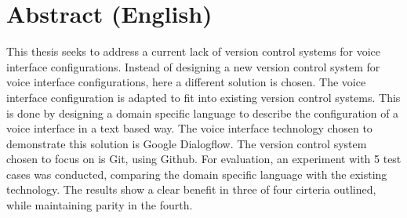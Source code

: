 \chapter*{Abstract (English)}

This thesis seeks to address a current lack of version control systems for voice interface configurations. Instead of designing a new version control system for voice interface configurations, here a different solution is chosen. The voice interface configuration is adapted to fit into existing version control systems.
This is done by designing a domain specific language to describe the configuration of a voice interface in a text based way.
The voice interface technology chosen to demonstrate this solution is Google Dialogflow. The version control system chosen to focus on is Git, using Github.
For evaluation, an experiment with 5 test cases was conducted, comparing the domain specific language with the existing technology.
The results show a clear benefit in three of four cirteria outlined, while maintaining parity in the fourth.